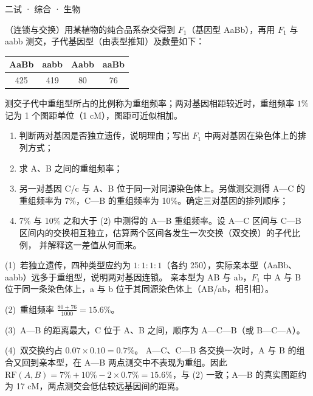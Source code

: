 \documentclass[cjk=noto, seal=first]{mojing-exam}
\begin{document}
\begin{paper}[time={建议 1.5 小时（训练设置）}, full=100]{二试 · 综合 · 生物}
\begin{questions}
\question[25]
（连锁与交换）用某植物的纯合品系杂交得到 $F_1$（基因型 AaBb），再用 $F_1$ 与 aabb 测交，子代基因型（由表型推知）及数量如下：
\begin{center}
\begin{tabular}{cccc}
  \toprule
  AaBb & aabb & Aabb & aaBb \\
  \midrule
  425 & 419 & 80 & 76 \\
  \bottomrule
\end{tabular}
\end{center}
测交子代中重组型所占的比例称为重组频率；两对基因相距较近时，重组频率 $1\%$ 记为 1 个图距单位（1 cM），图距可近似相加。
\begin{enumerate}
  \item 判断两对基因是否独立遗传，说明理由；写出 $F_1$ 中两对基因在染色体上的排列方式；
  \item 求 A、B 之间的重组频率；
  \item 另一对基因 C/c 与 A、B 位于同一对同源染色体上。另做测交测得 A—C 的重组频率为 7\%，C—B 的重组频率为 10\%。确定三对基因的排列顺序；
  \item 7\% 与 10\% 之和大于 (2) 中测得的 A—B 重组频率。设 A—C 区间与 C—B 区间内的交换相互独立，估算两个区间各发生一次交换（双交换）的子代比例，
        并解释这一差值从何而来。
\end{enumerate}
\answerspace{2cm}
\begin{solution}
(1)~若独立遗传，四种类型应约为 $1:1:1:1$（各约 250），实际亲本型（AaBb、aabb）远多于重组型，说明两对基因连锁。
亲本型为 AB 与 ab，$F_1$ 中 A 与 B 位于同一条染色体上，a 与 b 位于其同源染色体上（AB/ab，相引相）。

(2)~重组频率 $\frac{80+76}{1000}=15.6\%$。

(3)~A—B 的距离最大，C 位于 A、B 之间，顺序为 A—C—B（或 B—C—A）。

(4)~双交换约占 $0.07\times0.10=0.7\%$。
A—C、C—B 各交换一次时，A 与 B 的组合又回到亲本型，在 A—B 两点测交中不表现为重组。因此
$\mathrm{RF}(A,B)=7\%+10\%-2\times0.7\%=15.6\%$，与 (2) 一致；A—B 的真实图距约为 17 cM，两点测交会低估较远基因间的距离。
\end{solution}


\end{questions}
\end{paper}
\end{document}
